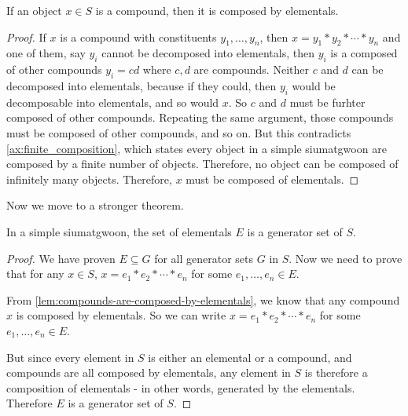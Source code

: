\begin{lemma}\label{lem:compounds-are-composed-by-elementals}
    If an object $x\in S$ is a compound, then it is composed by elementals.
\end{lemma}
\begin{proof}
    If $x$ is a compound with constituents $y_1, \dots, y_n$, then $x = y_1 * y_2 * \cdots * y_n$ and one of them, say $y_i$ cannot be decomposed into elementals, then $y_i$ is a composed of other compounds $y_i =cd$ where $c,d$ are compounds. Neither $c$ and $d$ can be decomposed into elementals, because if they could, then $y_i$ would be decomposable into elementals, and so would $x$. So $c$ and $d$ must be furhter composed of other compounds. Repeating the same argument, those compounds must be composed of other compounds, and so on. But this contradicts \ref{ax:finite_composition}, which states every object in a simple siumatgwoon are composed by a finite number of objects. Therefore, no object can be composed of infinitely many objects. Therefore, $x$ must be composed of elementals.
\end{proof}


Now we move to a stronger theorem.

\begin{theorem}\label{thm:elementals-are-a-generator-set-in-simple-siumatgwoons} 
    In a simple siumatgwoon, the set of elementals $E$ is a generator set of $S$.
\end{theorem}

\begin{proof}
    We have proven $E\subseteq G$ for all generator sets $G$ in $S$. Now we need to prove that for any $x\in S$, $x = e_1 * e_2 * \cdots * e_n$ for some $e_1, \dots, e_n \in E$.

    From \ref{lem:compounds-are-composed-by-elementals}, we know that any compound $x$ is composed by elementals. So we can write $x = e_1 * e_2 * \cdots * e_n$ for some $e_1, \dots, e_n \in E$.

    But since every element in $S$ is either an elemental or a compound, and compounds are all composed by elementals, any element in $S$ is therefore a composition of elementals - in other words, generated by the elementals. Therefore $E$ is a generator set of $S$.
\end{proof}


